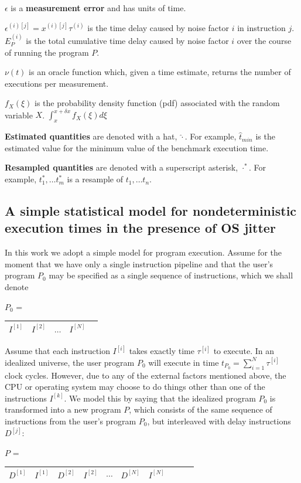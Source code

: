 \documentclass[conference]{IEEEtran}
\begin{document}
$\epsilon$ is a \textbf{measurement error} and has units of time.

$\epsilon^{(i)[j]} = x^{(i)[j]} \tau^{(i)}$ is the time delay caused by noise factor $i$ in instruction $j$. $E_P^{(i)}$ is the total cumulative time delay caused by noise factor $i$ over the course of running the program $P$.

$\nu(t)$ is an oracle function which, given a time estimate, returns the number of executions per measurement.

$f_X(\xi)$ is the probability density function (pdf) associated with the random variable $X$. $\int_{x}^{x+\delta x} f_X(\xi) d\xi$

\textbf{Estimated quantities} are denoted with a hat, $\hat\cdot$. For example, $\hat t_{min}$ is the estimated value for the minimum value of the benchmark execution time.

\textbf{Resampled quantities} are denoted with a superscript asterisk, $\cdot^*$. For example, $t^*_1, \dots t^*_m$ is a resample of $t_1, \dots t_n$.

\label{sec:statmodel}
\subsection{A simple statistical model for nondeterministic execution times in the presence of OS jitter}

In this work we adopt a simple model for program execution. Assume for the moment that we have only a single instruction pipeline and that the user's program $P_0$ may be specified as a single sequence of instructions, which we shall denote

$P_0$ = \begin{tabular}{|c|c|c|c|c|}
\hline
$I^{[1]}$ & $I^{[2]}$ & $\dots$ & $I^{[N]}$ \tabularnewline
\hline
\end{tabular}

Assume that each instruction $I^{[i]}$ takes exactly time $\tau^{[i]}$ to execute.
In an idealized universe, the user program $P_0$ will execute in time $t_{P_0} = \sum_{i=1}^N \tau^{[i]}$ clock cycles. However, due to any of the external factors mentioned above, the CPU or operating system may choose to do things other than one of the instructions $I^{[k]}$. We model this by saying that the idealized program $P_0$ is transformed into a new program $P$, which consists of the same sequence of instructions from the user's program $P_0$, but interleaved with delay instructions $D^{[j]}$:

$P$ = \begin{tabular}{|c|c|c|c|c|c|c|c|c|c|}
\hline
$D^{[1]}$ & $I^{[1]}$ & $D^{[2]}$ & $I^{[2]}$ &
$\cdots$ & $D^{[N]}$ & $I^{[N]}$
\tabularnewline
\hline
\end{tabular}
\end{document}
